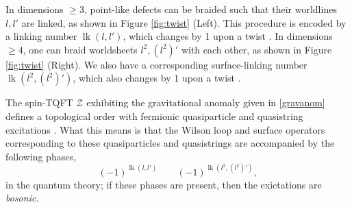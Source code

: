 \documentclass[onecolumn]{article}
\theoremstyle{theorem}
\theoremstyle{remark}
\theoremstyle{example}
\theoremstyle{definition}
\numberwithin{equation}{section}
\begin{document}
In dimensions $\geq 3$, point-like defects can be braided such that their worldlines $l,l'$ are { {linked}}, as shown in Figure \ref{fig:twist} {(Left).} %
 This procedure is encoded by a {linking number} $\operatorname{lk}(l,l')$, which changes by 1 upon a twist \cite{Guo_2020}. In dimensions $\geq 4$, one can braid { {worldsheets}} $l^2,(l^2)'$ with each other, as shown in Figure \ref{fig:twist} ({Right}). We also have a corresponding { {surface}}-linking number $\operatorname{lk}(l^2,(l^2)')$, which also changes by 1 upon a twist \cite{Thorngren2015}. 

The spin-TQFT $\mathcal{Z}$ exhibiting the gravitational anomaly given in  \eqref{gravanom} defines a topological order with {{fermionic}} quasiparticle and quasistring excitations \cite{JuvenWang,Thorngren2015}. What this means is that the Wilson loop and surface operators corresponding to these quasiparticles and quasistrings are accompanied by the following phases,
\begin{equation}
    (-1)^{\operatorname{lk}(l,l')} \qquad  (-1)^{\operatorname{lk}(l^2,(l^2)')}, \label{selfstat}
\end{equation}
in the quantum theory; if these phases are present, then the exictations are {\it bosonic}. 


\newpage

% 
\printbibliography
\end{document}
